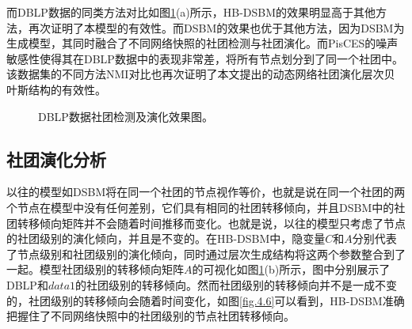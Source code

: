 而DBLP数据的同类方法对比如图\ref{fig.4.5}(a)所示，HB-DSBM的效果明显高于其他方法，再次证明了本模型的有效性。而DSBM的效果也优于其他方法，因为DSBM为生成模型，其同时融合了不同网络快照的社团检测与社团演化。而PisCES的噪声敏感性使得其在DBLP数据中的表现非常差，将所有节点划分到了同一个社团中。该数据集的不同方法NMI对比也再次证明了本文提出的动态网络社团演化层次贝叶斯结构的有效性。

\begin{figure}[htbp]
	\centering
	\caption{DBLP数据社团检测及演化效果图。}
	\label{fig.4.5}
\end{figure}


\subsection{社团演化分析}

以往的模型如DSBM将在同一个社团的节点视作等价，也就是说在同一个社团的两个节点在模型中没有任何差别，它们具有相同的社团转移倾向，并且DSBM中的社团转移倾向矩阵并不会随着时间推移而变化。也就是说，以往的模型只考虑了节点的社团级别的演化倾向，并且是不变的。在HB-DSBM中，隐变量$C$和$A$分别代表了节点级别和社团级别的演化倾向，同时通过层次生成结构将这两个参数整合到了一起。模型社团级别的转移倾向矩阵$A$的可视化如图\ref{fig.4.5}(b)所示，图中分别展示了DBLP和$data1$的社团级别的转移倾向。然而社团级别的转移倾向并不是一成不变的，社团级别的转移倾向会随着时间变化，如图\ref{fig.4.6}可以看到，HB-DSBM准确把握住了不同网络快照中的社团级别的节点社团转移倾向。

